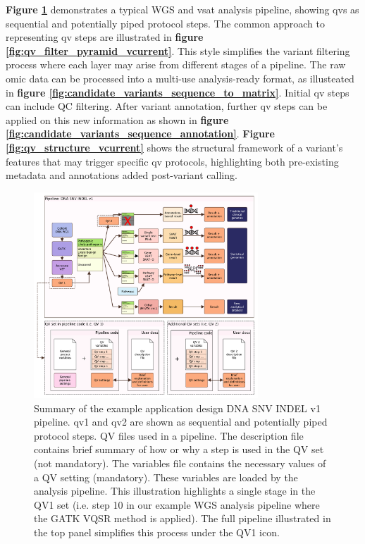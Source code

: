 \textbf{Figure \ref{fig:qv_pipeline_with_file_vcurrent}} 
demonstrates a typical WGS and \ac{vsat} analysis pipeline, showing \ac{qv}s as sequential and potentially piped protocol steps.
The common approach to representing \ac{qv} steps are illustrated in 
\textbf{figure \ref{fig:qv_filter_pyramid_vcurrent}}.
This style simplifies the variant filtering process where each layer may arise from different stages of a pipeline.
The raw omic data can be processed into a multi-use analysis-ready format, as illusteated in 
\textbf{figure 
\ref{fig:candidate_variants_sequence_to_matrix}}.
Initial \ac{qv} steps can include QC filtering. 
After variant annotation, further \ac{qv} steps can be applied on this new information as shown in 
\textbf{figure
\ref{fig:candidate_variants_sequence_annotation}}.
 \textbf{Figure 
\ref{fig:qv_structure_vcurrent}}
shows the structural framework of a variant's features that may trigger specific \ac{qv} protocols, highlighting both pre-existing metadata and annotations added post-variant calling.

\begin{figure}[h]
    \centering
   \includegraphics[width=0.75\textwidth]{./images/qv_pipeline_with_file_vcurrent.pdf}
    \caption{Summary of the example application design DNA SNV INDEL v1 pipeline. \ac{qv}1 and \ac{qv}2 are shown as sequential and potentially piped protocol steps.
    QV files used in a pipeline. The description file contains brief summary of how or why a step is used in the QV set (not mandatory). The variables file contains the necessary values of a QV setting (mandatory). These variables are loaded by the analysis pipeline. This illustration highlights a single stage in the QV1 set (i.e. step 10 in our example WGS analysis pipeline where the GATK VQSR method is applied). The full pipeline illustrated in the top panel simplifies this process under the QV1 icon.
    }
    \label{fig:qv_pipeline_with_file_vcurrent}
\end{figure}

